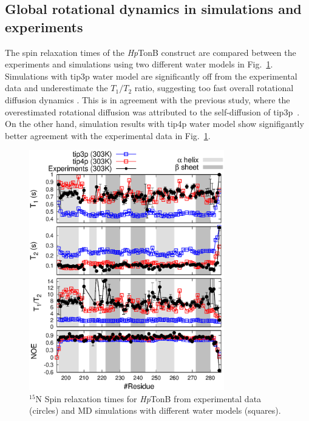 \documentclass[pre,aps,floatfix,authordate1-4,twocolumn]{revtex4-1}
\begin{document}
\subsection{Global rotational dynamics in simulations and experiments}

The spin relaxation times of the {\it Hp}TonB construct are compared 
between the experiments and simulations using two
different water models in Fig.~\ref{HpTonBrelaxationDATA}.
Simulations with tip3p water model are significantly
off from the experimental data and underestimate the $T_1/T_2$ ratio, suggesting too
fast overall rotational diffusion dynamics \cite{carper97}.
This is in agreement with the previous study, where the overestimated
rotational diffusion was attributed to the self-diffusion of tip3p~\cite{wong08}.
On the other hand, simulation results with tip4p water model show signifigantly
better agreement with the experimental data in  Fig.~\ref{HpTonBrelaxationDATA}.
\begin{figure}[!h]
  \includegraphics[width=8.5cm]{../Figs/HpTonBrelaxationDATA.eps}%
  \caption{$^{15}$N Spin relaxation times for {\it Hp}TonB from experimental data (circles)
    and MD simulations with different water models (squares).
    \label{HpTonBrelaxationDATA}}%
\end{figure}
\end{document}
